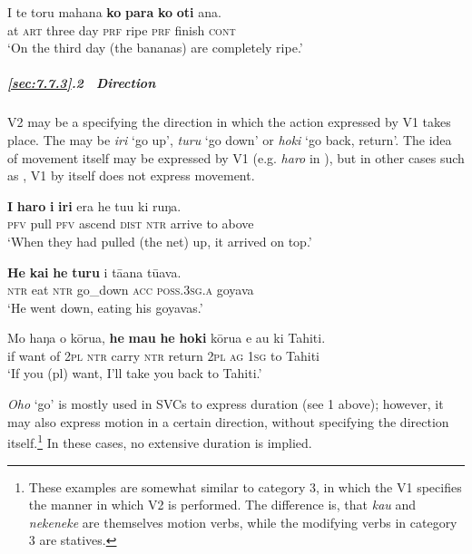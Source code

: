 \ea\label{ex:7.182}
\gll {\ꞌ}I te toru mahana \textbf{ko} \textbf{para} \textbf{ko} \textbf{oti} {\ꞌ}ana. \\
at \textsc{art} three day \textsc{prf} ripe \textsc{prf} finish \textsc{cont} \\

\glt 
‘On the third day (the bananas) are completely ripe.’ \textstyleExampleref{[R539-2.071]}
\z

\subparagraph{\ref{sec:7.7.3}.2~ Direction} V2 may be a  specifying the direction in which the action expressed by V1 takes place. The  may be \textit{iri} ‘go up’, \textit{turu} ‘go down’ or \textit{hoki} ‘go back, return’. The idea of movement itself may be expressed by V1 (e.g. \textit{haro} in ), but in other cases such as , V1 by itself does not express movement.

\ea\label{ex:7.183}
\gll \textbf{I} \textbf{haro} \textbf{i} \textbf{iri} era he tu{\ꞌ}u ki ruŋa. \\
\textsc{pfv} pull \textsc{pfv} ascend \textsc{dist} \textsc{ntr} arrive to above \\

\glt 
‘When they had pulled (the net) up, it arrived on top.’ \textstyleExampleref{[R304.136]} 
\z

\ea\label{ex:7.184}
\gll \textbf{He} \textbf{kai} \textbf{he} \textbf{turu} i tā{\ꞌ}ana tūava. \\
\textsc{ntr} eat \textsc{ntr} go\_down \textsc{acc} \textsc{poss.3sg.a} goyava \\

\glt 
‘He went down, eating his goyavas.’ \textstyleExampleref{[R245.024]} 
\z

\ea\label{ex:7.185}
\gll Mo haŋa o kōrua, \textbf{he} \textbf{ma{\ꞌ}u} \textbf{he} \textbf{hoki} kōrua e au ki Tahiti. \\
if want of \textsc{2pl} \textsc{ntr} carry \textsc{ntr} return \textsc{2pl} \textsc{ag} \textsc{1sg} to Tahiti \\

\glt
‘If you (pl) want, I’ll take you back to Tahiti.’ \textstyleExampleref{[R231.102]} 
\z

\textit{Oho} ‘go’ is mostly used in SVCs to express duration (see 1 above); however, it may also express motion in a certain direction, without specifying the direction itself.\footnote{\label{fn:378}These examples are somewhat similar to category 3, in which the V1 specifies the manner in which V2 is performed. The difference is, that \textit{kau} and \textit{nekeneke} are themselves motion verbs, while the modifying verbs in category 3 are statives.} In these cases, no extensive duration is implied.

